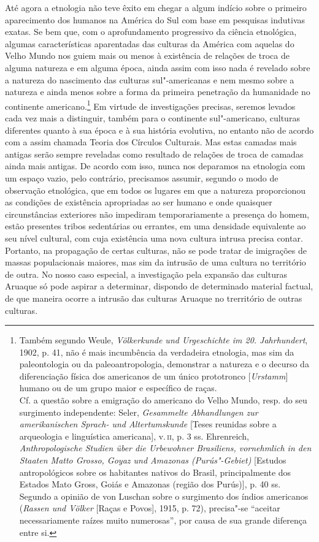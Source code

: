 Até agora a etnologia não teve êxito em chegar a algum indício sobre o
primeiro aparecimento dos humanos na América do Sul com base em
pesquisas indutivas exatas. Se bem que, com o aprofundamento progressivo
da ciência etnológica, algumas características aparentadas das culturas
da América com aquelas do Velho Mundo nos guiem mais ou menos à
existência de relações de troca de alguma natureza e em alguma época,
ainda assim com isso nada é revelado sobre a natureza do nascimento das
culturas sul"-americanas e nem mesmo sobre a natureza e ainda menos sobre
a forma da primeira penetração da humanidade no continente
americano.\footnote{Também segundo Weule, \emph{Völkerkunde und
  Urgeschichte im 20. Jahrhundert}, 1902, p. 41, não é mais incumbência
  da verdadeira etnologia, mas sim da paleontologia ou da
  paleoantropologia, demonstrar a natureza e o decurso da diferenciação
  física dos americanos de um único prototronco {[}\emph{Urstamm}{]}
  humano ou de um grupo maior e específico de raças.\\
  Cf. a questão sobre a emigração do americano do Velho Mundo, resp. do
  seu surgimento independente: Seler, \emph{Gesammelte Abhandlungen zur
  amerikanischen Sprach- und Altertumskunde} {[}Teses reunidas sobre a
  arqueologia e linguística americana{]}, v.\,\textsc{ii}, p. 3 ss. Ehrenreich,
  \emph{Anthropologische Studien über die Urbewohner Brasiliens,
  vornehmlich in den Staaten Matto Grosso, Goyaz und Amazonas
  (Purús"-Gebiet)} {[}Estudos antropológicos sobre os habitantes nativos
  do Brasil, principalmente dos Estados Mato Gross, Goiás e Amazonas
  (região dos Purús){]}, p. 40 ss. Segundo a opinião de von Luschan
  sobre o surgimento dos índios americanos (\emph{Rassen und Völker}
  {[}Raças e Povos{]}, 1915, p. 72), precisa"-se ``aceitar
  necessariamente raízes muito numerosas'', por causa de sua grande
  diferença entre si.} Em virtude de investigações precisas, seremos levados
cada vez mais a distinguir, também para o continente sul"-americano,
culturas diferentes quanto à sua época e à sua história evolutiva, no
entanto não de acordo com a assim chamada Teoria dos Círculos
Culturais. Mas estas camadas mais antigas serão sempre reveladas como
resultado de relações de troca de camadas ainda mais antigas. De acordo
com isso, nunca nos deparamos na etnologia com um espaço vazio, pelo
contrário, precisamos assumir, segundo o modo de observação etnológica,
que em todos os lugares em que a natureza proporcionou as condições de
existência apropriadas ao ser humano e onde quaisquer circunstâncias
exteriores não impediram temporariamente a presença do homem, estão
presentes tribos sedentárias ou errantes, em uma densidade equivalente
ao seu nível cultural, com cuja existência uma nova cultura intrusa
precisa contar. Portanto, na propagação de certas culturas, não se pode
tratar de imigrações de massas populacionais maiores, mas sim da
intrusão de uma cultura no território de outra. No nosso caso especial,
a investigação pela expansão das culturas Aruaque só pode aspirar a
determinar, dispondo de determinado material factual, de que maneira
ocorre a intrusão das culturas Aruaque no trerritório de outras
culturas.

